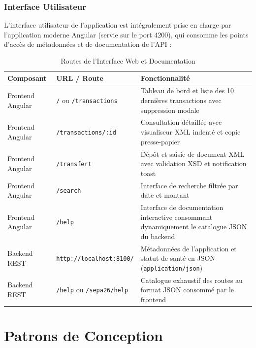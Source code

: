 \documentclass[12pt,a4paper]{article}
\begin{document}
\newpage

\subsubsection{Interface Utilisateur}
L'interface utilisateur de l'application est intégralement prise en charge par l'application moderne Angular (servie sur le port 4200), qui consomme les points d'accès de métadonnées et de documentation de l'API :

\begin{table}[H]
    \centering
    \small
    \begin{tabularx}{\textwidth}{|l|l|Y|}
        \hline
        \textbf{Composant} & \textbf{URL / Route} & \textbf{Fonctionnalité} \\
        \hline
        Frontend Angular & \texttt{/} ou \texttt{/transactions} & Tableau de bord et liste des 10 dernières transactions avec suppression modale \\
        \hline
        Frontend Angular & \texttt{/transactions/:id} & Consultation détaillée avec visualiseur XML indenté et copie presse-papier \\
        \hline
        Frontend Angular & \texttt{/transfert} & Dépôt et saisie de document XML avec validation XSD et notification toast \\
        \hline
        Frontend Angular & \texttt{/search} & Interface de recherche filtrée par date et montant \\
        \hline
        Frontend Angular & \texttt{/help} & Interface de documentation interactive consommant dynamiquement le catalogue JSON du backend \\
        \hline
        Backend REST & \texttt{http://localhost:8100/} & Métadonnées de l'application et statut de santé en JSON (\texttt{application/json}) \\
        \hline
        Backend REST & \texttt{/help} ou \texttt{/sepa26/help} & Catalogue exhaustif des routes au format JSON consommé par le frontend \\
        \hline
    \end{tabularx}
    \caption{Routes de l'Interface Web et Documentation}
\end{table}

\newpage

\section{Patrons de Conception}
\end{document}
